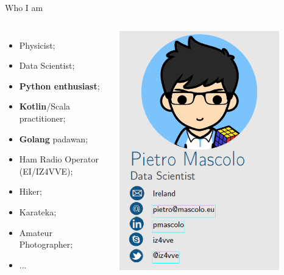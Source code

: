 \documentclass[10pt]{beamer}
\begin{document}
	\begin{frame}{Who I am}
		\begin{columns}
			\begin{itemize}
   				\item Physicist;
   				\item Data Scientist;
   				\item \textbf{Python enthusiast};
   				\item \textbf{Kotlin}/Scala practitioner;
   				\item \textbf{Golang} padawan;
   				\item Ham Radio Operator (EI/IZ4VVE);
   				\item Hiker;
   				\item Karateka;
   				\item Amateur Photographer;
   				\item ...
			\end{itemize}
   			
   			\begin{flushright}
   			
   			
   				\includegraphics[width=0.83\textwidth]{imgs/me.png}
			\end{flushright}
		\end{columns}
	\end{frame}
	
\end{document}
